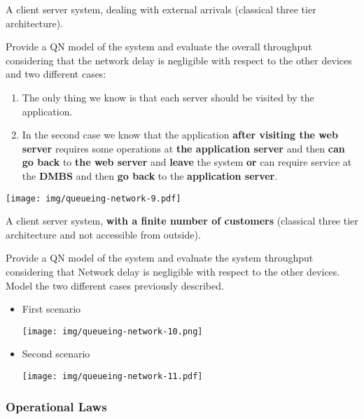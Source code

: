 \begin{examplebox}
	A client server system, dealing with external arrivals (classical three tier architecture).
	
	Provide a QN model of the system and evaluate the overall throughput considering that the network delay is negligible with respect to the other devices and two different cases:
	\begin{enumerate}
		\item The only thing we know is that each server should be visited by the application.
		\item In the second case we know that the application \textbf{after visiting the web server} requires some operations at \textbf{the application server} and then \textbf{can go back} to \textbf{the web server} and \textbf{leave} the system \textbf{or} can require service at the \textbf{DMBS} and then \textbf{go back} to the \textbf{application server}.
	\end{enumerate}
	\begin{center}
		\texttt{[image: img/queueing-network-9.pdf]}
	\end{center}
\end{examplebox}

\begin{examplebox}
	A client server system, \textbf{with a finite number of customers} (classical three tier architecture and not accessible from outside).
	
	Provide a QN model of the system and evaluate the system throughput considering that Network delay is negligible with respect to the other devices. Model the two different cases previously described.
	\begin{itemize}
		\item First scenario
		\begin{center}
			\texttt{[image: img/queueing-network-10.png]}
		\end{center}
		
		\item Second scenario
		\begin{center}
			\texttt{[image: img/queueing-network-11.pdf]}
		\end{center}
	\end{itemize}
\end{examplebox}

\newpage

\subsubsection{Operational Laws}

